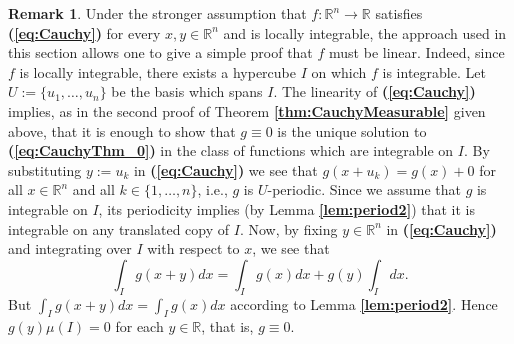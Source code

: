 \documentclass[12 pt]{amsart}
\theoremstyle{definition}
\newtheorem{remark}[thm]{Remark}
\newcommand{\R}{\mathbb{R}}
\newcommand{\bref}[1]{\textbf{\ref{#1}}} %
\newcommand{\beqref}[1]{\textbf{(\ref{#1})}} %
\begin{document}
\begin{remark}\label{rem:Integral}
Under the stronger assumption that $f:\R^n\to \R$ satisfies \beqref{eq:Cauchy} for every $x,y\in\R^n$ and is locally integrable, the approach used in this section allows one to give a simple proof that $f$ 
must be linear. Indeed, since $f$ is locally integrable, there exists a hypercube $I$ on which $f$ is integrable. Let $U:=\{u_1,\ldots,u_n\}$ be the basis which spans $I$. The linearity of \beqref{eq:Cauchy} implies, as in the second proof of Theorem \bref{thm:CauchyMeasurable} given above, that it is enough to show that $g\equiv 0$ 
is the unique solution to \beqref{eq:CauchyThm_0} in the class of functions which are integrable on $I$. By substituting $y:=u_k$  in \beqref{eq:Cauchy} we see that $g(x+u_k)=g(x)+0$ for all $x\in \R^n$ and all $k\in \{1,\ldots,n\}$, i.e., $g$ is $U$-periodic. Since we assume that $g$ is integrable on $I$, its periodicity implies (by Lemma \bref{lem:period2}) that it is integrable on any translated copy of $I$. Now, by fixing $y\in \R^n$ in \beqref{eq:Cauchy} and integrating over $I$ with respect to $x$, we see that 
\begin{equation*}\label{eq:Int}
\int_{I}g(x+y)dx=\int_I g(x)dx+g(y)\int_I dx. 
\end{equation*}
But $\int_{I}g(x+y)dx=\int_I g(x)dx$ according to Lemma \bref{lem:period2}. Hence $g(y)\mu(I)=0$ for each $y\in \R$, that is, $g\equiv 0$.
\end{remark}
\end{document}
